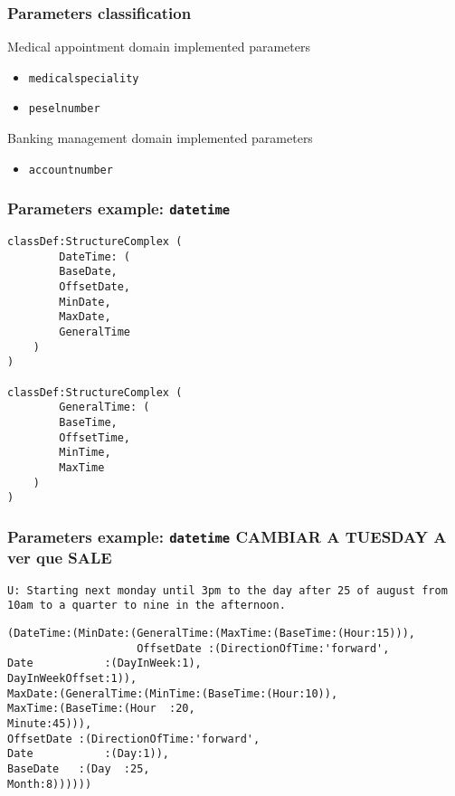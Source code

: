 \documentclass[11pt]{beamer}
\begin{document}
\begin{frame}[fragile]
\frametitle{Parameters classification}
	\begin{block}{Medical appointment domain implemented parameters}
		\begin{itemize}
			\item \texttt{medicalspeciality}
			\item \texttt{peselnumber}
		\end{itemize}
	\end{block}
	\begin{block}{Banking management domain implemented parameters}
		\begin{itemize}
			\item \texttt{accountnumber}
		\end{itemize}
	\end{block}
\end{frame}
	
\begin{frame}[fragile]
\frametitle{Parameters example: \texttt{datetime}}
\scriptsize
\begin{lstlisting}[language=lekta]
classDef:StructureComplex (
		DateTime: (
		BaseDate,
		OffsetDate,
		MinDate,
		MaxDate,
		GeneralTime
	)
)

classDef:StructureComplex (
		GeneralTime: (
		BaseTime,
		OffsetTime,
		MinTime,
		MaxTime
	)
)
\end{lstlisting}
\end{frame}
	
\begin{frame}[fragile]
\frametitle{Parameters example: \texttt{datetime} CAMBIAR A TUESDAY A ver que SALE}
\scriptsize
{\color{teal} 
	\texttt{U: Starting next monday until 3pm to the day after 25 of august from 10am to a quarter to nine in the afternoon.}\\
}
\begin{lstlisting}[language=lekta]
(DateTime:(MinDate:(GeneralTime:(MaxTime:(BaseTime:(Hour:15))),
                    OffsetDate :(DirectionOfTime:'forward',
Date           :(DayInWeek:1),
DayInWeekOffset:1)),
MaxDate:(GeneralTime:(MinTime:(BaseTime:(Hour:10)),
MaxTime:(BaseTime:(Hour  :20,
Minute:45))),
OffsetDate :(DirectionOfTime:'forward',
Date           :(Day:1)),
BaseDate   :(Day  :25,
Month:8))))))
\end{lstlisting}
\end{frame}
	
\end{document}
